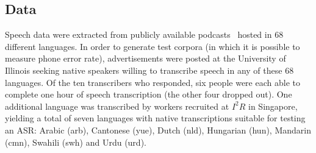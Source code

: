 \subsection{Data}
\label{sec:data}

Speech data were extracted from publicly available podcasts~\cite{SBS}
hosted in 68 different languages.  In order to generate test corpora
(in which it is possible to measure phone error rate), advertisements
were posted at the University of Illinois seeking native speakers
willing to transcribe speech in any of these 68 languages.  Of the ten
transcribers who responded, six people were each able to complete one
hour of speech transcription (the other four dropped out).  One
additional language was transcribed by workers recruited at $I^2R$ in
Singapore, yielding a total of seven languages with native
transcriptions suitable for testing an ASR: Arabic (arb), Cantonese
(yue), Dutch (nld), Hungarian (hun), Mandarin (cmn), Swahili (swh) and
Urdu (urd).

